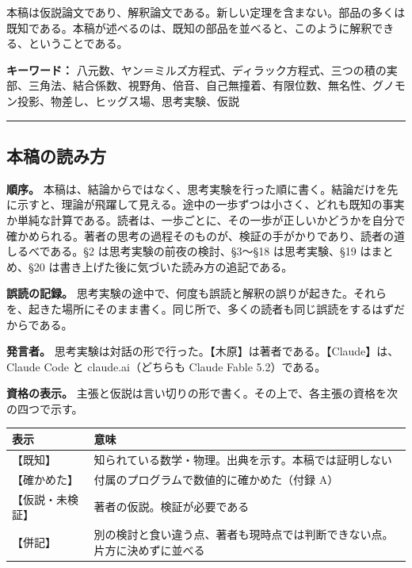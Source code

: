 \documentclass[
  a4paper,
]{ltjsarticle}
\newcounter{none} %
\begin{document}
本稿は仮説論文であり、解釈論文である。新しい定理を含まない。部品の多くは既知である。本稿が述べるのは、既知の部品を並べると、このように解釈できる、ということである。

\textbf{キーワード：}
八元数、ヤン＝ミルズ方程式、ディラック方程式、三つの積の実部、三角法、結合係数、視野角、倍音、自己無撞着、有限位数、無名性、グノモン投影、物差し、ヒッグス場、思考実験、仮説

\begin{center}\rule{0.5\linewidth}{0.5pt}\end{center}

\subsection{本稿の読み方}\label{ux672cux7a3fux306eux8aadux307fux65b9}

\textbf{順序。}
本稿は、結論からではなく、思考実験を行った順に書く。結論だけを先に示すと、理論が飛躍して見える。途中の一歩ずつは小さく、どれも既知の事実か単純な計算である。読者は、一歩ごとに、その一歩が正しいかどうかを自分で確かめられる。著者の思考の過程そのものが、検証の手がかりであり、読者の道しるべである。§2
は思考実験の前夜の検討、§3〜§18 は思考実験、§19 はまとめ、§20
は書き上げた後に気づいた読み方の追記である。

\textbf{誤読の記録。}
思考実験の途中で、何度も誤読と解釈の誤りが起きた。それらを、起きた場所にそのまま書く。同じ所で、多くの読者も同じ誤読をするはずだからである。

\textbf{発言者。}
思考実験は対話の形で行った。【木原】は著者である。【Claude】は、Claude
Code と claude.ai（どちらも Claude Fable 5.2）である。

\textbf{資格の表示。}
主張と仮説は言い切りの形で書く。その上で、各主張の資格を次の四つで示す。

{\def\LTcaptype{none} %
\begin{longtable}[]{@{}
  >{\raggedright\arraybackslash}p{}
  >{\raggedright\arraybackslash}p{}@{}}
\toprule\noalign{}
\begin{minipage}[b]{\linewidth}\raggedright
表示
\end{minipage} & \begin{minipage}[b]{\linewidth}\raggedright
意味
\end{minipage} \\
\midrule\noalign{}
\endhead
\bottomrule\noalign{}
\endlastfoot
【既知】 & 知られている数学・物理。出典を示す。本稿では証明しない \\
【確かめた】 & 付属のプログラムで数値的に確かめた（付録 A） \\
【仮説・未検証】 & 著者の仮説。検証が必要である \\
【併記】 &
別の検討と食い違う点、著者も現時点では判断できない点。片方に決めずに並べる \\
\end{longtable}
}
\end{document}
